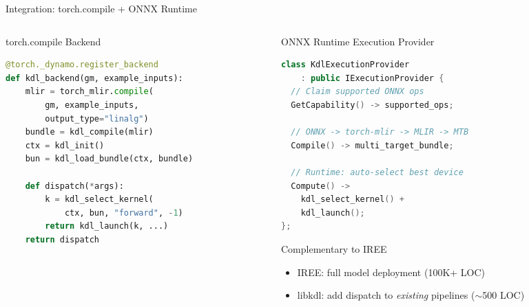 \documentclass[aspectratio=169,10pt]{beamer}
\begin{document}
\begin{frame}[fragile]{Integration: torch.compile + ONNX Runtime}
  \begin{columns}[T]
    \begin{column}{0.48\textwidth}
      \begin{block}{torch.compile Backend}
        \begin{lstlisting}[language=Python,morekeywords={torch,kdl_init,kdl_load_bundle,kdl_select_kernel,kdl_launch}]
@torch._dynamo.register_backend
def kdl_backend(gm, example_inputs):
    mlir = torch_mlir.compile(
        gm, example_inputs,
        output_type="linalg")
    bundle = kdl_compile(mlir)
    ctx = kdl_init()
    bun = kdl_load_bundle(ctx, bundle)

    def dispatch(*args):
        k = kdl_select_kernel(
            ctx, bun, "forward", -1)
        return kdl_launch(k, ...)
    return dispatch
        \end{lstlisting}
      \end{block}
    \end{column}
    \begin{column}{0.48\textwidth}
      \begin{block}{ONNX Runtime Execution Provider}
        \begin{lstlisting}[language=C++,morekeywords={IExecutionProvider,KdlExecutionProvider}]
class KdlExecutionProvider
    : public IExecutionProvider {
  // Claim supported ONNX ops
  GetCapability() -> supported_ops;

  // ONNX -> torch-mlir -> MLIR -> MTB
  Compile() -> multi_target_bundle;

  // Runtime: auto-select best device
  Compute() ->
    kdl_select_kernel() +
    kdl_launch();
};
        \end{lstlisting}
      \end{block}
      \vspace{0.3em}
      \begin{exampleblock}{Complementary to IREE}
        \begin{itemize}
          \item IREE: full model deployment (100K+ LOC)
          \item libkdl: add dispatch to \emph{existing} pipelines ($\sim$500 LOC)
        \end{itemize}
      \end{exampleblock}
    \end{column}
  \end{columns}
\end{frame}
\end{document}
